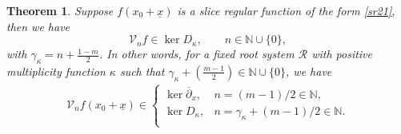 \documentclass{amsart}
\newtheorem{theorem}{Theorem}[section]
\theoremstyle{definition}
\theoremstyle{remark}
\numberwithin{equation}{section}
\begin{document}
\begin{theorem} Suppose $f(x_{0}+\underline{x})$ is a slice regular function of the form \eqref{sr21}, then we have
\begin{equation*}
   \mathcal{V}_{n}f \in \ker D_{\kappa}, \qquad n\in \mathbb{N}\cup \{0\},
\end{equation*}
with $\gamma_{\kappa}=n+\frac{1-m}{2}$. In other words, for a fixed root system $\mathscr{R}$ with positive  multiplicity function $\kappa$ such that $\gamma_{\kappa}+\left(\frac{m-1}{2}\right)\in \mathbb{N}\cup \{0\}$, we have
\begin{equation} \label{qq1}
    		\begin{split}
    			\mathcal{V}_{n}f(x_{0}+\underline{x})\in \left\{
    			\begin{array}{ll}
    				  \ker \overline{\partial}_{x}, &  n=(m-1)/2\in \mathbb{N},\\
    				\ker D_{\kappa}, &  n=\gamma_{\kappa}+(m-1)/2\in \mathbb{N}.\\
    			\end{array}
    			\right.
    		\end{split}
    	\end{equation}
\end{theorem}
\end{document}
